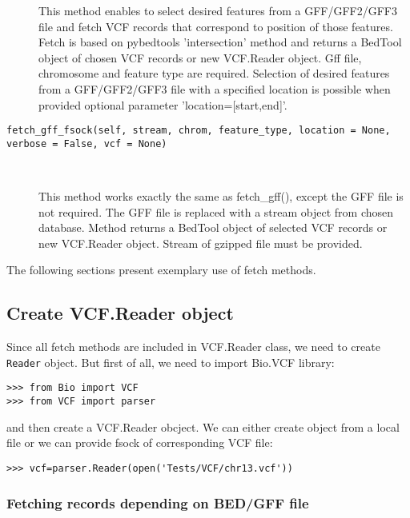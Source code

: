 \begin{description}
    This method enables to select desired features from a GFF/GFF2/GFF3 file and fetch VCF records
    that correspond to position of those features. Fetch is based on pybedtools 'intersection' method and returns
    a BedTool object of chosen VCF records or new VCF.Reader object.
    Gff file, chromosome and feature type are required.
    Selection of desired features from a GFF/GFF2/GFF3 file with a specified location is possible when
    provided optional parameter 'location=[start,end]'.

  \item[\texttt{fetch\_gff\_fsock(self, stream, chrom, feature\_type, location = None, verbose = False, vcf = None)}] \
  
    This method works exactly the same as fetch\_gff(), except the GFF file is not required.
    The GFF file is replaced with a stream object from chosen database.
    Method returns a BedTool object of selected VCF records or new VCF.Reader object.
    Stream of gzipped file must be provided.

\end{description}


\noindent The following sections present exemplary use of fetch methods.


\subsection{Create VCF.Reader object}
\label{sec:object}


\noindent Since all fetch methods are included in VCF.Reader class, we need to create \verb|Reader| object. But first of all,
we need to import Bio.VCF library:


\begin{verbatim}
>>> from Bio import VCF
>>> from VCF import parser

\end{verbatim}

\noindent and then create a VCF.Reader obcject. We can either create object from a local file or we can provide fsock
of corresponding VCF file:


\begin{verbatim}
>>> vcf=parser.Reader(open('Tests/VCF/chr13.vcf'))

\end{verbatim}

\subsubsection{Fetching records depending on BED/GFF file}



